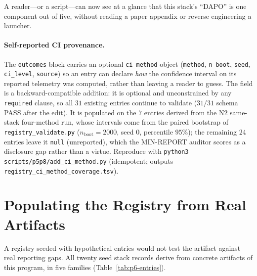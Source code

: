 \documentclass{article}
\begin{document}
A reader---or a script---can now see at a glance that this stack's ``DAPO'' is
one component out of five, without reading a paper appendix or reverse
engineering a launcher.

\paragraph{Self-reported CI provenance.} The \texttt{outcomes} block carries
an optional \texttt{ci\_method} object (\texttt{method}, \texttt{n\_boot},
\texttt{seed}, \texttt{ci\_level}, \texttt{source}) so an entry can declare
\emph{how} the confidence interval on its reported telemetry was computed,
rather than leaving a reader to guess. The field is a backward-compatible
addition: it is optional and unconstrained by any \texttt{required} clause, so
all $31$ existing entries continue to validate ($31/31$ schema PASS after the
edit). It is populated on the $7$ entries derived from the N2 same-stack
four-method run, whose intervals come from the paired bootstrap of
\texttt{registry\_validate.py} ($n_{\text{boot}}{=}2000$, seed $0$, percentile
$95\%$); the remaining $24$ entries leave it \texttt{null} (unreported), which
the MIN-REPORT auditor scores as a disclosure gap rather than a virtue.
Reproduce with \texttt{python3 scripts/p5p8/add\_ci\_method.py} (idempotent;
outputs \texttt{registry\_ci\_method\_coverage.tsv}).
 \section{Populating the Registry from Real Artifacts}
\label{sec:p6-population}

A registry seeded with hypothetical entries would not test the artifact against
real reporting gaps. All twenty seed stack records derive from concrete
artifacts of this program, in five families (Table~\ref{tab:p6-entries}).
\end{document}
